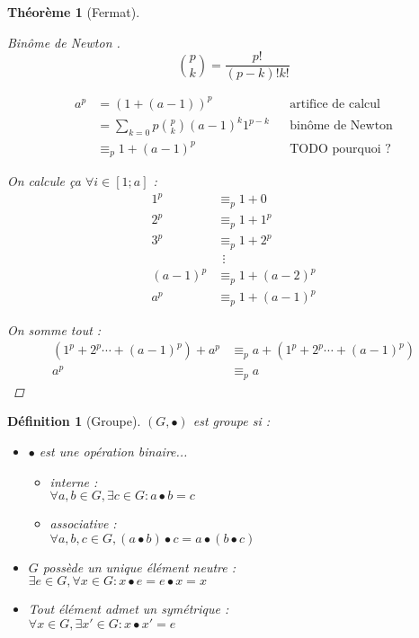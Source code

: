 \documentclass[11pt,twocolumn]{article}
\theoremstyle{plain}
\newtheorem{df}{Définition}
\newtheorem{thm}{Théorème}
\begin{document}
\begin{thm}[Fermat]
\begin{proof}[Binôme de Newton \cite{Buys}]
		\[
			\binom p k = \frac{p!}{\left(p-k\right)!k!}
		\]

		\begin{align*}
			a^p
			&= \left(1+\left(a-1\right)\right)^p && \text{artifice de calcul} \\
			&= \sum_{k=0}p \binom pk(a-1)^k1^{p-k} && \text{binôme de Newton} \\
			&\equiv_p 1 + (a-1)^p && \text{TODO pourquoi ?}
		\end{align*}

		On calcule ça $\forall i \in [1;a]$ :
		\begin{align*}
			1^p &\equiv_p 1+0 \\
			2^p &\equiv_p 1+1^p \\
			3^p &\equiv_p 1+2^p \\
			& ~~\vdots \\
			(a-1)^p &\equiv_p 1+(a-2)^p \\
			a^p &\equiv_p 1+(a-1)^p
		\end{align*}

		On somme tout :
		\begin{align*}
			\left(1^p + 2^p \cdots + (a-1)^p\right) + a^p
				&\equiv_p a + \left(1^p + 2^p \cdots + (a-1)^p\right) \\
			a^p &\equiv_p a
		\end{align*}
	\end{proof}
\end{thm}
\begin{df}[Groupe] $(G, \bullet)$ est groupe si :
	\begin{itemize}
		\item $\bullet$ est une opération binaire...
			\begin{itemize}
				\item interne : \\
					$\forall a, b \in G, \exists c \in G : a \bullet b = c$
				\item associative : \\
					$\forall a, b, c \in G,
					(a \bullet b) \bullet c = a \bullet (b \bullet c)$
			\end{itemize}
		\item $G$ possède un unique élément neutre : \\
			$\exists e \in G, \forall x \in G : x \bullet e = e \bullet x = x$
		\item Tout élément admet un symétrique : \\
			$\forall x \in G, \exists x' \in G : x \bullet x' = e$
	\end{itemize}
\end{df}
\end{document}
